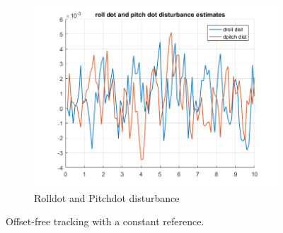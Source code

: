 \documentclass[11pt]{article}
\begin{document}
\begin{enumerate}
\begin{figure}[ht]
\begin{subfigure}[c]{0.3\linewidth}
            \includegraphics[width=\linewidth]{Plots_09_OffsetFreeTracking_Constant/10}
            \caption{Rolldot and Pitchdot disturbance}
        \end{subfigure}
        \caption{Offset-free tracking with a constant reference.}
        \label{fig:offset_free_tracking_with_constant}
    \end{figure}


\end{enumerate}
\end{document}

